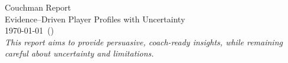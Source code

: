 \begin{titlepage}
\centering
{\LARGE Couchman Report\\[0.5em]}
{\large Evidence–Driven Player Profiles with Uncertainty}\\[2em]
{\large \today\ (\buildmode)}\\[6em]
\vfill
\textit{This report aims to provide persuasive, coach-ready insights, while
remaining careful about uncertainty and limitations.}
\end{titlepage}
